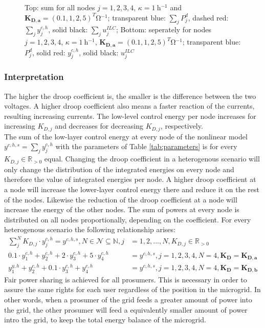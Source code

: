 \begin{figure}[h]
	\caption{Top: sum for all nodes $j = 1,2,3,4$, $\kappa = \SI{1}{\hour ^{-1}}$ and $\boldsymbol{K_{D,a}} = (0.1,1,2,5)^T\si{\ohm ^{-1}}$; transparent blue: $\sum_{j} P_j^d$, dashed red: $\sum_{j} y_j^{c,h}$, solid black: $\sum_{j}u_j^{ILC}$; Bottom: seperately for nodes $j = 1,2,3,4$, $\kappa = \SI{1}{\hour ^{-1}}$, $\boldsymbol{K_{D,a}} = (0.1,1,2,5)^T\si{\ohm ^{-1}}$; transparent blue: $P_j^d$, solid red: $y_j^{c,h}$, solid black: $u_j^{ILC}$}
	\label{fig:k1_KDa}
\end{figure}

\subsubsection*{Interpretation}
The higher the droop coefficient is, the smaller is the difference between the two voltages. A higher droop coefficient also means a faster reaction of the currents, resulting increasing currents. The low-level control energy per node increases for increasing $K_{D,j}$ and decreases for decreasing $K_{D,j}$, respectively.
\\The sum of the low-layer control energy at every node of the nonlinear model $y^{c,h,s} = \sum_{j}y^{c,h}_j$ with the parameters of Table \ref{tab:parameters} is for every $K_{D,j}\in \mathbb{R}_{>0}$ equal. Changing the droop coefficient in a heterogenous scenario will only change the distribution of the integrated energies on every node and therefore the value of integrated energies per node.
A higher droop coefficient at a node will increase the lower-layer control energy there and reduce it on the rest of the nodes. Likewise the reduction of the droop coefficient at a node will increase the energy of the other nodes. The sum of powers at every node is distributed on all nodes proportionally, depending on the coefficient. 
For every heterogenous scenario the following relationship arises:
\begin{align}
\sum_{j}^{N} K_{D,j} \cdot y^{c,h}_j = y^{c,h,s},N \in \mathcal{N} \subseteq \mathbb{N},j&={1,2,...,N},K_{D,j} \in \mathbb{R}_{>0} \label{eq:sum_energy_het} \\
0.1 \cdot y^{c,h}_1 + y^{c,h}_2 + 2 \cdot y^{c,h}_3 + 5 \cdot y^{c,h}_4 &= y^{c,h,s}, j=1,2,3,4, N=4, \boldsymbol{K_{D}} = \boldsymbol{K_{D,a}} \nonumber  \\
y^{y,h}_1 + y^{c,h}_2 + 0.1 \cdot y^{c,h}_3 + y^{c,h}_4 &= y^{c,h,s},j=1,2,3,4, N=4, \boldsymbol{K_{D}} = \boldsymbol{K_{D,b}} \nonumber
\end{align}
Fair power sharing is achieved for all prosumers. This is necessary in order to assure the same rights for each user regardless of the position in the microgrid. In other words, when a prosumer of the grid feeds a greater amount of power into the grid, the other prosumer will feed a equivalently smaller amount of power intro the grid, to keep the total energy balance of the microgrid.
